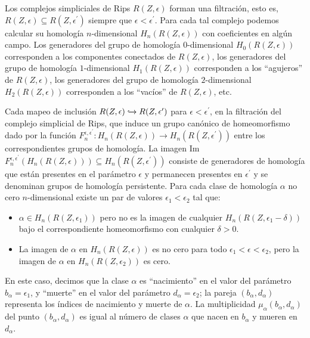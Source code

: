 Los complejos simpliciales de Rips $R(Z,\epsilon)$ forman una filtración, esto es, $R(Z,\epsilon) \subseteq R(Z,\epsilon^{\prime})$ siempre que $\epsilon < \epsilon^{\prime} $. Para cada tal complejo podemos calcular su homología $n$-dimensional $H_n(R(Z,\epsilon))$ con coeficientes en algún campo. Los generadores del grupo de homología $0$-dimensional $H_0(R(Z,\epsilon))$ corresponden a los componentes conectados de $R(Z,\epsilon)$, los generadores del grupo de homología $1$-dimensional $H_1(R(Z,\epsilon))$ corresponden a los ``agujeros'' de $R(Z,\epsilon)$, los generadores del grupo de homología $2$-dimensional $H_2(R(Z,\epsilon))$ corresponden a los ``vacíos'' de $R(Z,\epsilon)$, etc.

Cada mapeo de inclusión $R(Z,\epsilon) \xhookrightarrow{} R(Z,\epsilon^{\prime})$ para $\epsilon < \epsilon^{\prime}$, en la filtración del complejo simplicial de Rips, que induce un grupo canónico de homeomorfismo dado por la función $F_n^{\epsilon,\epsilon^{\prime}}:H_n(R(Z,\epsilon)) \to H_n(R(Z,\epsilon^{\prime}))$ entre los correspondientes grupos de homología. La imagen Im$F_n^{\epsilon,\epsilon^{\prime}}(H_n(R(Z,\epsilon))) \subseteq  H_n(R(Z,\epsilon^{\prime})) $ consiste de generadores de homología que están presentes en el parámetro $\epsilon$ y permanecen presentes en $\epsilon^{\prime}$ y se denominan grupos de homología persistente. Para cada clase de homología $\alpha$ no cero $n$-dimensional existe un par de valores $\epsilon_1 < \epsilon_2$ tal que:

\begin{itemize}
	\item $\alpha \in H_n(R(Z,\epsilon_1))$ pero no es la imagen de cualquier $H_n(R(Z,\epsilon_1-\delta))$ bajo el correspondiente homeomorfismo con cualquier $\delta > 0$.
	\item La imagen de $\alpha$ en $H_n(R(Z,\epsilon))$ es no cero para todo $\epsilon_1 < \epsilon < \epsilon_2$, pero la imagen de $\alpha$ en $H_n(R(Z,\epsilon_2))$ es cero.
\end{itemize}

En este caso, decimos que la clase $\alpha$ es ``nacimiento'' en el valor del parámetro $b_\alpha = \epsilon_1$, y ``muerte'' en el valor del parámetro $d_\alpha = \epsilon_2$; la pareja $(b_\alpha,d_\alpha)$ representa los índices de  nacimiento y muerte de $\alpha$. La multiplicidad $\mu_\alpha(b_\alpha,d_\alpha)$ del punto $(b_\alpha,d_\alpha)$ es igual al número de clases $\alpha$ que nacen en $b_\alpha$ y mueren en $d_\alpha$.


